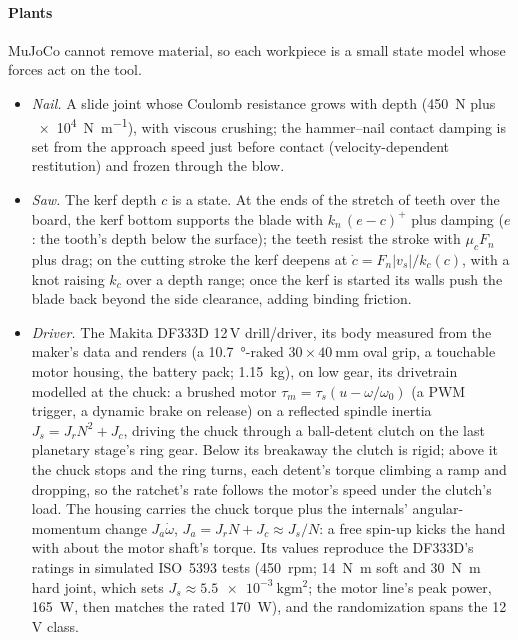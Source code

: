 \paragraph{Plants} MuJoCo cannot remove material, so each workpiece is a small state model whose forces act on the
tool.
\begin{itemize}
  \item \emph{Nail.} A slide joint whose Coulomb resistance grows with depth (\SI{450}{\newton} plus
    \SI{e4}{\newton\per\metre}), with viscous crushing; the hammer--nail contact damping is set from the approach
    speed just before contact (velocity-dependent restitution) and frozen through the blow.
  \item \emph{Saw.} The kerf depth $c$ is a state. At the ends of the stretch of teeth over the board, the kerf
    bottom supports the blade with $k_n\,(e-c)^+$ plus damping ($e$: the tooth's depth below the surface); the
    teeth resist the stroke with $\mu_c F_n$ plus drag; on the cutting stroke the kerf deepens at
    $\dot c = F_n|v_s|/k_c(c)$, with a knot raising $k_c$ over a depth range; once the kerf is started its walls push
    the blade back beyond the side clearance, adding binding friction.
  \item \emph{Driver.} The Makita DF333D 12\,V drill/driver, its body measured from the maker's data and renders (a
    \SI{10.7}{\degree}-raked $30\times\SI{40}{\milli\metre}$ oval grip, a touchable motor housing, the battery
    pack; \SI{1.15}{\kilogram}), on low gear, its drivetrain modelled at the chuck: a brushed motor
    $\tau_m = \tau_s(u - \omega/\omega_0)$ (a PWM trigger, a dynamic brake on release) on a reflected spindle inertia
    $J_s = J_r N^2 + J_c$, driving the chuck through a ball-detent clutch on the last planetary stage's ring gear. Below
    its breakaway the clutch is rigid; above it the chuck stops and the ring turns, each detent's torque climbing a
    ramp and dropping, so the ratchet's rate follows the motor's speed under the clutch's load. The housing carries the
    chuck torque plus the internals' angular-momentum change $J_a\dot\omega$, $J_a = J_r N + J_c \approx J_s/N$: a free
    spin-up kicks the hand with about the motor shaft's torque. Its values reproduce the DF333D's ratings in
    simulated ISO~5393 tests (\SI{450}{rpm}; \SI{14}{\newton\metre} soft and \SI{30}{\newton\metre} hard joint, which
    sets $J_s \approx \SI{5.5e-3}{\kilogram\metre\squared}$; the motor line's peak power, \SI{165}{\watt}, then
    matches the rated \SI{170}{\watt}), and the randomization spans the 12\,V class.

\end{itemize}
